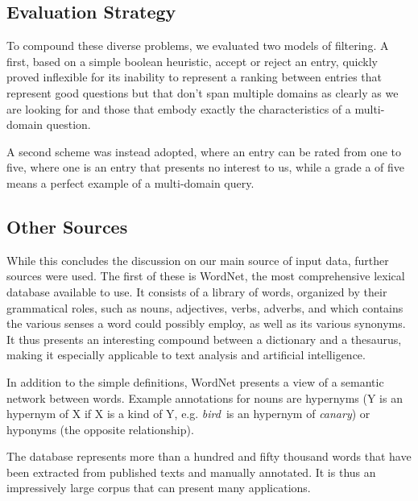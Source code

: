
\subsection{Evaluation Strategy} %
\label{sub:evaluation_strategy}

To compound these diverse problems, we evaluated two models of filtering. A first, based on a simple boolean heuristic, accept or reject an entry, quickly proved inflexible for its inability to represent a ranking between entries that represent good questions but that don't span multiple domains as clearly as we are looking for and those that embody exactly the characteristics of a multi-domain question.

A second scheme was instead adopted, where an entry can be rated from one to five, where one is an entry that presents no interest to us, while a grade a of five means a perfect example of a multi-domain query.


\subsection{Other Sources} %
\label{sub:other_sources}

While this concludes the discussion on our main source of input data, further sources were used. The first of these is WordNet\cite{Miller90wordnet:an}, the most comprehensive lexical database available to use. It consists of a library of words, organized by their grammatical roles, such as nouns, adjectives, verbs, adverbs, and which contains the various senses a word could possibly employ, as well as its various synonyms. It thus presents an interesting compound between a dictionary and a thesaurus, making it especially applicable to text analysis and artificial intelligence.

In addition to the simple definitions, WordNet presents a view of a semantic network between words. Example annotations for nouns are hypernyms (Y is an hypernym of X if X is a kind of Y, e.g. \emph{bird}\ is an hypernym of \emph{canary}) or hyponyms (the opposite relationship).

The database represents more than a hundred and fifty thousand words that have been extracted from published texts and manually annotated. It is thus an impressively large corpus that can present many applications.


